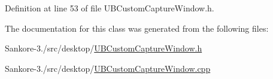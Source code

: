 Definition at line 53 of file U\-B\-Custom\-Capture\-Window.\-h.



The documentation for this class was generated from the following files\-:\begin{DoxyCompactItemize}
\item 
Sankore-\/3./src/desktop/\hyperlink{_u_b_custom_capture_window_8h}{U\-B\-Custom\-Capture\-Window.\-h}\item 
Sankore-\/3./src/desktop/\hyperlink{_u_b_custom_capture_window_8cpp}{U\-B\-Custom\-Capture\-Window.\-cpp}\end{DoxyCompactItemize}
